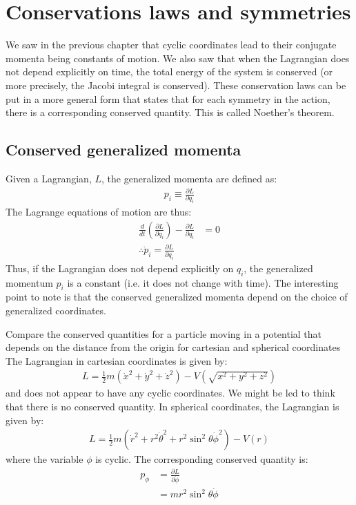 \chapter{Conservations laws and symmetries}
\label{chap:ConsLaws}
We saw in the previous chapter that cyclic coordinates lead to their conjugate momenta being constants of motion. We also saw that when the Lagrangian does not depend explicitly on time, the total energy of the system is conserved (or more precisely, the Jacobi integral is conserved). These conservation laws can be put in a more general form that states that for each symmetry in the action, there is a corresponding conserved quantity. This is called Noether's theorem.

\section{Conserved generalized momenta}
Given a Lagrangian, $L$, the generalized momenta are defined as:
\begin{align}
p_i\equiv\frac{\partial L}{\partial \dot{q}_i}
\end{align}
The Lagrange equations of motion are thus:
\begin{align}
\frac{d}{dt}\left(\frac{\partial L}{\partial \dot{q}_i}\right)-\frac{\partial L}{\partial q_i}&=0\nonumber\\
\therefore \dot{p}_i=\frac{\partial L}{\partial q_i}
\end{align}
Thus, if the Lagrangian does not depend explicitly on $q_i$, the generalized momentum $p_i$ is a constant (i.e. it does not change with time). The interesting point to note is that the conserved generalized momenta depend on the choice of generalized coordinates.

\begin{example}{0pt}{Compare the conserved quantities for a particle moving in a potential that depends on the distance from the origin for cartesian and spherical coordinates}{}
The Lagrangian in cartesian coordinates is given by:
\begin{align*}
L=\frac{1}{2}m(\dot{x}^2+\dot{y}^2+\dot{z}^2)-V\left(\sqrt{x^2+y^2+z^2}\right)
\end{align*}
and does not appear to have any cyclic coordinates. We might be led to think that there is no conserved quantity.
In spherical coordinates, the Lagrangian is given by:
\begin{align*}
L=\frac{1}{2}m(\dot{r}^2+r^2\dot{\theta}^2+r^2\sin^2{\theta}\dot{\phi}^2)-V(r)
\end{align*}
where the variable $\phi$ is cyclic. The corresponding conserved quantity is:
\begin{align*}
p_\phi &=\frac{\partial L}{\partial \dot{\phi}}\\
&=mr^2\sin^2\theta\dot{\phi}
\end{align*}
\end{example}


